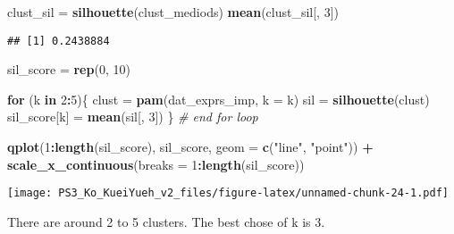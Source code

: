 \documentclass[]{article}
\newenvironment{Shaded}{\begin{snugshade}}{\end{snugshade}}
\newcommand{\KeywordTok}[1]{\textcolor[rgb]{0.13,0.29,0.53}{\textbf{#1}}}
\newcommand{\DataTypeTok}[1]{\textcolor[rgb]{0.13,0.29,0.53}{#1}}
\newcommand{\DecValTok}[1]{\textcolor[rgb]{0.00,0.00,0.81}{#1}}
\newcommand{\StringTok}[1]{\textcolor[rgb]{0.31,0.60,0.02}{#1}}
\newcommand{\CommentTok}[1]{\textcolor[rgb]{0.56,0.35,0.01}{\textit{#1}}}
\newcommand{\ControlFlowTok}[1]{\textcolor[rgb]{0.13,0.29,0.53}{\textbf{#1}}}
\newcommand{\OperatorTok}[1]{\textcolor[rgb]{0.81,0.36,0.00}{\textbf{#1}}}
\newcommand{\NormalTok}[1]{#1}
\begin{document}
\begin{Shaded}
\begin{Highlighting}[]
\NormalTok{clust_sil =}\StringTok{ }\KeywordTok{silhouette}\NormalTok{(clust_mediods)}
\KeywordTok{mean}\NormalTok{(clust_sil[, }\DecValTok{3}\NormalTok{])}
\end{Highlighting}
\end{Shaded}

\begin{verbatim}
## [1] 0.2438884
\end{verbatim}

\begin{Shaded}
\begin{Highlighting}[]
\NormalTok{sil_score =}\StringTok{ }\KeywordTok{rep}\NormalTok{(}\DecValTok{0}\NormalTok{, }\DecValTok{10}\NormalTok{)}

\ControlFlowTok{for}\NormalTok{ (k }\ControlFlowTok{in} \DecValTok{2}\OperatorTok{:}\DecValTok{5}\NormalTok{)\{}
\NormalTok{    clust =}\StringTok{ }\KeywordTok{pam}\NormalTok{(dat_exprs_imp, }\DataTypeTok{k =}\NormalTok{ k)}
\NormalTok{    sil   =}\StringTok{ }\KeywordTok{silhouette}\NormalTok{(clust)}
\NormalTok{    sil_score[k] =}\StringTok{ }\KeywordTok{mean}\NormalTok{(sil[, }\DecValTok{3}\NormalTok{])    }
\NormalTok{\} }\CommentTok{# end for loop}

\KeywordTok{qplot}\NormalTok{(}\DecValTok{1}\OperatorTok{:}\KeywordTok{length}\NormalTok{(sil_score), sil_score, }\DataTypeTok{geom =} \KeywordTok{c}\NormalTok{(}\StringTok{"line"}\NormalTok{, }\StringTok{"point"}\NormalTok{)) }\OperatorTok{+}
\StringTok{    }\KeywordTok{scale_x_continuous}\NormalTok{(}\DataTypeTok{breaks =} \DecValTok{1}\OperatorTok{:}\KeywordTok{length}\NormalTok{(sil_score))}
\end{Highlighting}
\end{Shaded}

\texttt{[image: PS3\_Ko\_KueiYueh\_v2\_files/figure-latex/unnamed-chunk-24-1.pdf]}

There are around 2 to 5 clusters. The best chose of k is 3.
\end{document}
